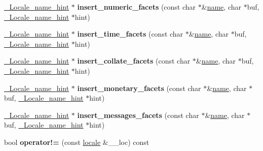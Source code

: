 \begin{DoxyCompactItemize}
\hyperlink{struct___locale__name__hint}{\+\_\+\+Locale\+\_\+name\+\_\+hint} $\ast$ {\bfseries insert\+\_\+numeric\+\_\+facets} (const char $\ast$\&\hyperlink{structname}{name}, char $\ast$buf, \hyperlink{struct___locale__name__hint}{\+\_\+\+Locale\+\_\+name\+\_\+hint} $\ast$hint)
\item 
\mbox{\label{class___locale__impl_afb5b6863c5c35d9870d4abf4bbafcfa2}} 
\hyperlink{struct___locale__name__hint}{\+\_\+\+Locale\+\_\+name\+\_\+hint} $\ast$ {\bfseries insert\+\_\+time\+\_\+facets} (const char $\ast$\&\hyperlink{structname}{name}, char $\ast$buf, \hyperlink{struct___locale__name__hint}{\+\_\+\+Locale\+\_\+name\+\_\+hint} $\ast$hint)
\item 
\mbox{\label{class___locale__impl_aa41669b9879dfea6249b8402653db26b}} 
\hyperlink{struct___locale__name__hint}{\+\_\+\+Locale\+\_\+name\+\_\+hint} $\ast$ {\bfseries insert\+\_\+collate\+\_\+facets} (const char $\ast$\&\hyperlink{structname}{name}, char $\ast$buf, \hyperlink{struct___locale__name__hint}{\+\_\+\+Locale\+\_\+name\+\_\+hint} $\ast$hint)
\item 
\mbox{\label{class___locale__impl_aefc7fe76050f8ea203620eef70ad0bd0}} 
\hyperlink{struct___locale__name__hint}{\+\_\+\+Locale\+\_\+name\+\_\+hint} $\ast$ {\bfseries insert\+\_\+monetary\+\_\+facets} (const char $\ast$\&\hyperlink{structname}{name}, char $\ast$buf, \hyperlink{struct___locale__name__hint}{\+\_\+\+Locale\+\_\+name\+\_\+hint} $\ast$hint)
\item 
\mbox{\label{class___locale__impl_a59d872099e7b0403256bc8fce1d2d7c5}} 
\hyperlink{struct___locale__name__hint}{\+\_\+\+Locale\+\_\+name\+\_\+hint} $\ast$ {\bfseries insert\+\_\+messages\+\_\+facets} (const char $\ast$\&\hyperlink{structname}{name}, char $\ast$buf, \hyperlink{struct___locale__name__hint}{\+\_\+\+Locale\+\_\+name\+\_\+hint} $\ast$hint)
\item 
\mbox{\label{class___locale__impl_a163ce035d2d9343078e6aeeeba46538c}} 
bool {\bfseries operator!=} (const \hyperlink{classlocale}{locale} \&\+\_\+\+\_\+loc) const
\end{DoxyCompactItemize}
